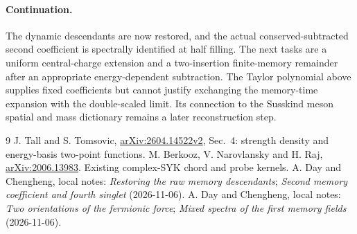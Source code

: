 \documentclass[11pt,a4paper]{article}
\begin{document}
\paragraph{Continuation.}
The dynamic descendants are now restored, and the actual
conserved-subtracted second coefficient is spectrally identified
at half filling. The next tasks are a uniform central-charge
extension and a two-insertion finite-memory remainder after an
appropriate energy-dependent subtraction. The Taylor polynomial
above supplies fixed coefficients but cannot justify exchanging
the memory-time expansion with the double-scaled limit. Its
connection to the Susskind meson spatial and mass dictionary
remains a later reconstruction step.

\begin{thebibliography}{9}\small
{} J. Tall and S. Tomsovic,
\href{https://arxiv.org/html/2604.14522v2}{arXiv:2604.14522v2},
Sec.~4: strength density and energy-basis two-point functions.
 M. Berkooz, V. Narovlansky and H. Raj,
\href{https://arxiv.org/abs/2006.13983}{arXiv:2006.13983}.
Existing complex-SYK chord and probe kernels.
 A. Day and Chengheng, local notes:
\emph{Restoring the raw memory descendants};
\emph{Second memory coefficient and fourth singlet} (2026-11-06).
 A. Day and Chengheng, local notes:
\emph{Two orientations of the fermionic force};
\emph{Mixed spectra of the first memory fields} (2026-11-06).
\end{thebibliography}
\end{document}
